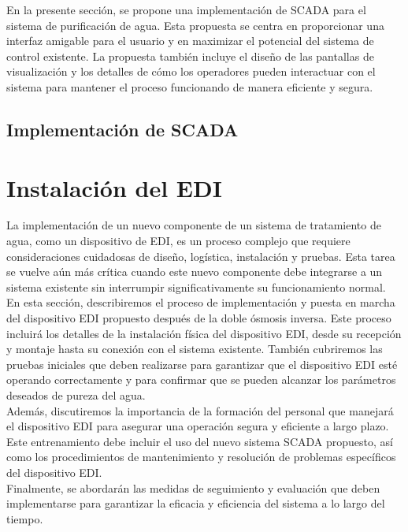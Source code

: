 En la presente sección, se propone una implementación de SCADA para el sistema de purificación de agua. Esta propuesta se centra en proporcionar una interfaz amigable para el usuario y en maximizar el potencial del sistema de control existente. La propuesta también incluye el diseño de las pantallas de visualización y los detalles de cómo los operadores pueden interactuar con el sistema para mantener el proceso funcionando de manera eficiente y segura.\\

\subsection{Implementación de SCADA}

\section{Instalación del EDI }
\label{sec:implementation_start}

La implementación de un nuevo componente de un sistema de tratamiento de agua,
como un dispositivo de EDI, es un proceso complejo que requiere consideraciones
cuidadosas de diseño, logística, instalación y pruebas. Esta tarea se vuelve
aún más crítica cuando este nuevo componente debe integrarse a un sistema
existente sin interrumpir significativamente su funcionamiento normal.\\

En esta sección, describiremos el proceso de implementación y puesta en marcha del dispositivo EDI propuesto después de la doble ósmosis inversa. Este proceso incluirá los detalles de la instalación física del dispositivo EDI, desde su recepción y montaje hasta su conexión con el sistema existente. También cubriremos las pruebas iniciales que deben realizarse para garantizar que el dispositivo EDI esté operando correctamente y para confirmar que se pueden alcanzar los parámetros deseados de pureza del agua.\\

Además, discutiremos la importancia de la formación del personal que manejará el dispositivo EDI para asegurar una operación segura y eficiente a largo plazo. Este entrenamiento debe incluir el uso del nuevo sistema SCADA propuesto, así como los procedimientos de mantenimiento y resolución de problemas específicos del dispositivo EDI. \\

Finalmente, se abordarán las medidas de seguimiento y evaluación que deben implementarse para garantizar la eficacia y eficiencia del sistema a lo largo del tiempo.\\

